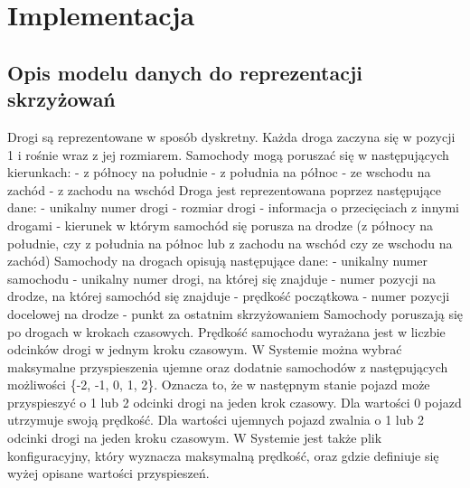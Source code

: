 \chapter{Implementacja} \label{chap:implementation}

\section{Opis modelu danych do reprezentacji skrzyżowań}

Drogi są reprezentowane w sposób dyskretny. Każda droga zaczyna się w pozycji 1 i rośnie wraz z jej rozmiarem. 
\newline
\newline
Samochody mogą poruszać się w następujących kierunkach:
\newline
- z północy na południe
\newline
- z południa na północ
\newline
- ze wschodu na zachód
\newline
- z zachodu na wschód
\newline
\newline
Droga jest reprezentowana poprzez następujące dane:
\newline
- unikalny numer drogi
\newline
- rozmiar drogi
\newline
- informacja o przecięciach z innymi drogami
\newline
- kierunek w którym samochód się porusza na drodze (z północy na południe, czy z południa na północ lub z zachodu na wschód czy ze wschodu na zachód)
\newline
\newline
Samochody na drogach opisują następujące dane:
\newline
- unikalny numer samochodu
\newline
- unikalny numer drogi, na której się znajduje
\newline
- numer pozycji na drodze, na której samochód się znajduje
\newline
- prędkość początkowa
\newline
- numer pozycji docelowej na drodze - punkt za ostatnim skrzyżowaniem
\newline
\newline
Samochody poruszają się po drogach w krokach czasowych. Prędkość samochodu wyrażana jest w liczbie odcinków drogi w jednym kroku czasowym.
\newline
\newline
W Systemie można wybrać maksymalne przyspieszenia ujemne oraz dodatnie samochodów z następujących możliwości \{-2, -1, 0, 1, 2\}. Oznacza to, że w następnym stanie pojazd może przyspieszyć o 1 lub 2 odcinki drogi na jeden krok czasowy. Dla wartości 0 pojazd utrzymuje swoją prędkość. Dla wartości ujemnych pojazd zwalnia o 1 lub 2 odcinki drogi na jeden kroku czasowym.
\newline
\newline
W Systemie jest także plik konfiguracyjny, który wyznacza maksymalną prędkość, oraz gdzie definiuje się wyżej opisane wartości przyspieszeń.

